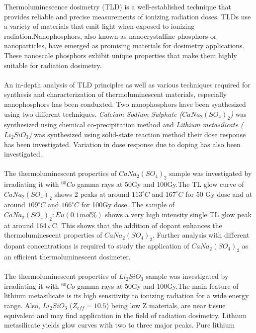 \documentclass[../Report.tex]{subfiles}
\begin{document}
    \vspace{1cm}
    \large
    Thermoluminescence dosimetry (TLD) is a well-established technique that provides reliable and precise measurements of ionizing radiation
    doses. TLDs use a variety of materials that emit light when exposed to ionizing radiation.Nanophosphors, also known as 
    nanocrystalline phosphors or nanoparticles, have 
    emerged as promising materials for dosimetry applications. These nanoscale phosphors exhibit unique properties 
    that make them highly suitable for radiation dosimetry.
    \\~\\
    An in-depth analysis of TLD principles as well as various techniques required for synthesis and characterization of thermoluminescent materials, 
    especially nanophosphors has been conduxted. Two nanophosphors have been synthesized using two different techniques.
    \textit{Calcium Sodium Sulphate ($CaNa_2{(SO_4)}_2$)} was synthesized using chemical co-precipitation method and 
    \textit{Lithium metasilicate ($Li_2SiO_3$)} was synthesized using solid-state reaction method their dose response 
    has been investigated. Variation in dose response due to doping has also been investigated.
    \\~\\
    The thermoluminescent properties of $CaNa_2{(SO_4)}_2$ sample was investigated by irradiating it with $^{60}Co$ 
    gamma rays at 50Gy and 100Gy.The TL glow curve of $CaNa_2{(SO_4)}_2$ shows 2 peaks at around $113^{\circ}C$ and $167^{\circ}C$ for 50 Gy
    dose and at around $109^{\circ}C$ and $166^{\circ}C$ for 100Gy dose. The sample of $CaNa_2{(SO_4)}_2:Eu(0.1mol\%)$ shows a
    very high intensity single TL glow peak at around 164◦C. This shows that the addition of dopant enhances
    the thermoluminescent properties of $CaNa_2{(SO_4)}_2$. Further analysis with different dopant concentrations is
    required to study the application of $CaNa_2{(SO_4)}_2$ as an efficient thermoluminescent dosimeter.
    \\~\\
    The thermoluminescent properties of $Li_2SiO_3$ sample was investigated by irradiating it with $^{60}Co$ 
    gamma rays at 50Gy and 100Gy.The main feature of lithium metasilicate is its high sensitivity to ionizing radiation for a wide energy range. 
    Also, $Li_2SiO_3$ ($Z_{eff} = 10.5$) being low Z materials, are near tissue equivalent and may find application in the field of 
    radiation dosimetry. Lithium metasilicate yields glow curves with two to three major peaks. Pure lithium 
\end{document}
